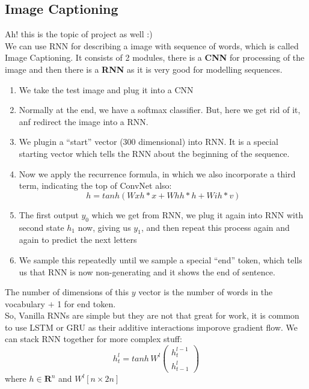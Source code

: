 \documentclass[12pt,a4paper]{article}
\begin{document}
\subsection{Image Captioning}
Ah! this is the topic of project as well :) \\
We can use RNN for describing a image with sequence of words, which is called Image Captioning. It consists of 2 modules, there is a \textbf{CNN} for processing of the image and then there is a \textbf{RNN} as it is very good for modelling sequences.
\begin{enumerate}
    \item We take the test image and plug it into a CNN
    \item Normally at the end, we have a softmax classifier. But, here we get rid of it, anf redirect the image into a RNN.
    \item We plugin a ``start'' vector (300 dimensional) into RNN. It is a special starting vector which tells the RNN about the beginning of the sequence.
    \item Now we apply the recurrence formula, in which we also incorporate a third term, indicating the top of ConvNet also:
    \begin{equation*}
        h = tanh(Wxh * x + Whh * h + Wih * v)
    \end{equation*}
    \item The first output $y_0$ which we get from RNN, we plug it again into RNN with second state $h_1$ now, giving us $y_1$, and then repeat this process again and again to predict the next letters
    \item We sample this repeatedly until we sample a special ``end'' token, which tells us that RNN is now non-generating and it shows the end of sentence.
\end{enumerate}
The number of dimensions of this $y$ vector is the number of words in the vocabulary $+$ 1 for end token. \\
So, Vanilla RNNs are simple but they are not that great for work, it is common to use LSTM or GRU as their additive interactions imporove gradient flow. We can stack RNN together for more complex stuff:
\begin{equation*}
    h_{t}^{l} = tanh \, W^{l} \begin{pmatrix}
  h_{t}^{l-1} \\ 
  h_{t-1}^l 
\end{pmatrix}
\end{equation*}
where $h \in \mathbf{R}^n$ and $W^{l}[n \times 2n]$ \\ 
\end{document}
